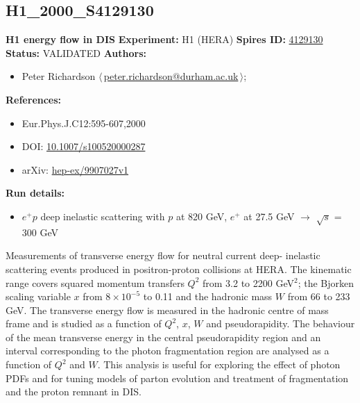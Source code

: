 \subsection[H1\_2000\_S4129130]{H1\_2000\_S4129130\,\cite{Adloff:1999ws}}
\textbf{H1 energy flow in DIS}\newline
\textbf{Experiment:} H1 (HERA) \newline
\textbf{Spires ID:} \href{http://www.slac.stanford.edu/spires/find/hep/www?rawcmd=key+4129130}{4129130}\newline
\textbf{Status:} VALIDATED\newline
\textbf{Authors:}
\begin{itemize}
  \item Peter Richardson $\langle\,$\href{mailto:peter.richardson@durham.ac.uk}{peter.richardson@durham.ac.uk}$\,\rangle$;
\end{itemize}
\textbf{References:}
\begin{itemize}
  \item Eur.Phys.J.C12:595-607,2000
  \item DOI: \href{http://dx.doi.org/10.1007/s100520000287}{10.1007/s100520000287}
  \item arXiv: \href{http://arxiv.org/abs/hep-ex/9907027v1}{hep-ex/9907027v1}
\end{itemize}
\textbf{Run details:}
\begin{itemize}

  \item $e^+ p$ deep inelastic scattering with $p$ at 820 GeV, $e^+$ at 27.5 GeV \ensuremath{\to} \ensuremath{\sqrt{s}} = 300 GeV\end{itemize}

\noindent Measurements of transverse energy flow for neutral current deep- inelastic scattering events produced in positron-proton collisions at HERA. The kinematic range covers squared momentum transfers $Q^2$ from 3.2 to 2200 GeV$^2$; the Bjorken scaling variable $x$ from $8 \times 10^{-5}$ to 0.11 and the hadronic mass $W$ from 66 to 233 GeV. The transverse energy flow is measured in the hadronic centre of mass frame and is studied as a function of $Q^2$, $x$, $W$ and pseudorapidity. The behaviour of the mean transverse energy in the central pseudorapidity region and an interval corresponding to the photon fragmentation region are analysed as a function of $Q^2$ and $W$.  This analysis is useful for exploring the effect of photon PDFs and for tuning models of parton evolution and treatment of fragmentation and the proton remnant in DIS.

